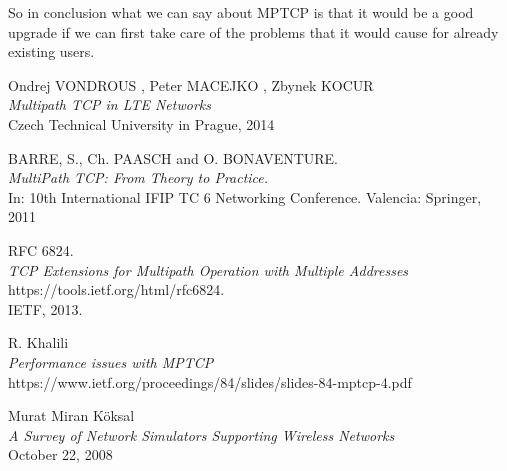 \documentclass[11pt,twocolumn]{article}
\begin{document}
So in conclusion what we can say about MPTCP is that it would be a good upgrade if we can first take care of the problems that it would cause for already existing users.

\newpage

\begin{thebibliography}{9}

Ondrej VONDROUS , Peter MACEJKO , Zbynek KOCUR \\
\emph{Multipath TCP in LTE Networks}\\
Czech Technical University in Prague, 2014

BARRE, S., Ch. PAASCH and O. BONAVENTURE.\\
\emph{MultiPath TCP: From Theory to Practice.}\\
In: 10th International IFIP TC 6 Networking
Conference. Valencia: Springer, 2011

RFC 6824.  \\
\emph{TCP Extensions for Multipath Operation with Multiple Addresses} \\ 
https://tools.ietf.org/html/rfc6824.\\ IETF, 2013.

R. Khalili\\
\emph{Performance issues with MPTCP}\\
https://www.ietf.org/proceedings/84/slides/slides-84-mptcp-4.pdf

Murat Miran Köksal\\
\emph{A Survey of Network Simulators Supporting Wireless Networks} \\
October 22, 2008





\end{thebibliography}
\end{document}
